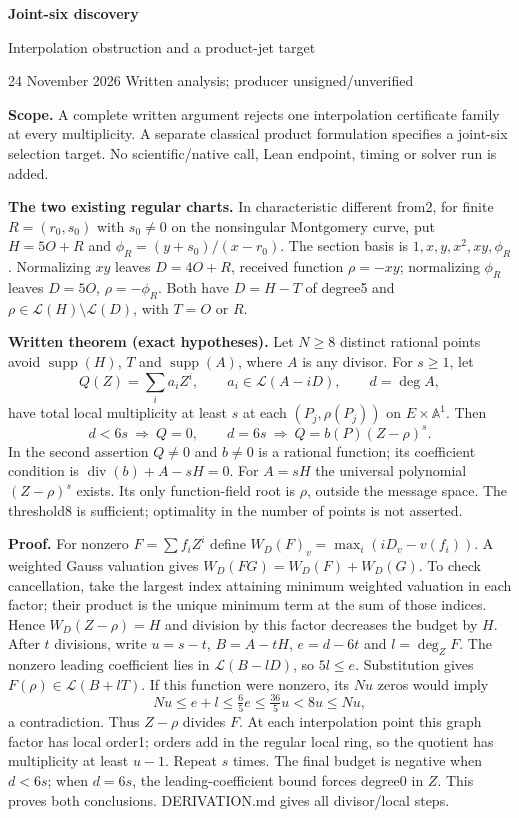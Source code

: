 \documentclass[10pt]{article}
\newcommand{\LL}{\mathcal L}
\begin{document}
{\LARGE\bf Joint-six discovery}\par
{\large Interpolation obstruction and a product-jet target}\par
24 November 2026 \hfill Written analysis; producer unsigned/unverified

\textbf{Scope.} A complete written argument rejects one interpolation
certificate family at every multiplicity. A separate classical product
formulation specifies a joint-six selection target. No scientific/native
call, Lean endpoint, timing or solver run is added.

\textbf{The two existing regular charts.}
In characteristic different from2, for finite $R=(r_0,s_0)$ with
$s_0\ne0$ on the nonsingular Montgomery curve,
put $H=5O+R$ and $\phi_R=(y+s_0)/(x-r_0)$. The section basis is
$1,x,y,x^2,xy,\phi_R$. Normalizing $xy$ leaves $D=4O+R$, received
function $\rho=-xy$; normalizing $\phi_R$ leaves $D=5O$,
$\rho=-\phi_R$. Both have $D=H-T$ of degree5 and
$\rho\in\LL(H)\setminus\LL(D)$, with $T=O$ or $R$.

\textbf{Written theorem (exact hypotheses).}
Let $N\ge8$ distinct rational points avoid $\operatorname{supp}(H)$,
$T$ and $\operatorname{supp}(A)$, where $A$ is any divisor. For $s\ge1$,
let
\[
 Q(Z)=\sum_i a_i Z^i,\qquad a_i\in\LL(A-iD),\qquad d=\deg A,
\]
have total local multiplicity at least $s$ at each
$(P_j,\rho(P_j))$ on $E\times\mathbb A^1$. Then
\[
 \boxed{d<6s\ \Longrightarrow\ Q=0,\qquad
 d=6s\ \Longrightarrow\ Q=b(P)(Z-\rho)^s.}
\]
In the second assertion $Q\ne0$ and $b\ne0$ is a rational function;
its coefficient condition is $\operatorname{div}(b)+A-sH=0$.
For $A=sH$ the universal polynomial $(Z-\rho)^s$ exists. Its only
function-field root is $\rho$, outside the message space. The threshold8
is sufficient; optimality in the number of points is not asserted.

\textbf{Proof.}
For nonzero $F=\sum f_iZ^i$ define
$W_D(F)_v=\max_i(iD_v-v(f_i))$. A weighted Gauss valuation gives
$W_D(FG)=W_D(F)+W_D(G)$. To check cancellation, take the largest index
attaining minimum weighted valuation in each factor; their product is
the unique minimum term at the sum of those indices. Hence
$W_D(Z-\rho)=H$ and division by this factor decreases the budget by $H$.
After $t$ divisions, write $u=s-t$, $B=A-tH$, $e=d-6t$ and
$l=\deg_Z F$. The nonzero leading coefficient lies in $\LL(B-lD)$,
so $5l\le e$. Substitution gives $F(\rho)\in\LL(B+lT)$.
If this function were nonzero, its $Nu$ zeros would imply
\[
 Nu\le e+l\le \tfrac65 e\le \tfrac{36}{5}u<8u\le Nu,
\]
a contradiction. Thus $Z-\rho$ divides $F$. At each interpolation point
this graph factor has local order1; orders add in the regular local
ring, so the quotient has multiplicity at least $u-1$.
Repeat $s$ times. The final budget is negative when $d<6s$;
when $d=6s$, the leading-coefficient bound forces degree0 in $Z$.
This proves both conclusions. DERIVATION.md gives all divisor/local steps.
\end{document}
